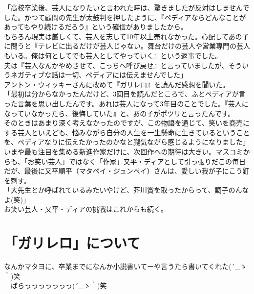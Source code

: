 「高校卒業後、芸人になりたいと言われた時は、驚きましたが反対はしませんでした。かつて顧問の先生が太鼓判を押したように、『ペディアならどんなことがあってもやり続けるだろう』という確信がありましたから。\\

もちろん現実は厳しくて、芸人を志して10年以上売れなかった。心配してあの子に問うと『テレビに出るだけが芸人じゃない。舞台だけの芸人や営業専門の芸人もいる。俺は何としてでも芸人としてやっていく』という返事でした。\\

夫は『芸人なんかやめさせて、こっちへ呼び戻せ』と言っていましたが、そういうネガティブな話は一切、ペディアには伝えませんでした」\\

アントン・ウィッキーさんに改めて『ガリレロ』を読んだ感想を聞いた。\\

「最初は分からなかったんだけど、3回目を読んだところで、ふとペディアが言った言葉を思い出したんです。あれは芸人になって3年目のことでした。『芸人になっていなかったら、後悔していた』と、あの子がポツリと言ったんです。\\

そのときはあまり深く考えなかったのですが、この物語を通じて、笑いを商売にする芸人といえども、悩みながら自分の人生を一生懸命に生きているということを、ペディアなりに伝えたかったのかなと朧気ながら感じるようになりました」\\

いまや最も注目を集める新進作家だけに、次回作への期待は大きい。マスコミからも、「お笑い芸人」ではなく「作家」又平・ディアとして引っ張りだこの毎日だが、最後に又平順平（マタペイ・ジュンペイ）さんは、愛しい我が子にこう釘を刺す。\\

「大先生とか呼ばれているみたいやけど、芥川賞を取ったからって、調子のんなよ(笑)」\\

お笑い芸人・又平・ディアの挑戦はこれからも続く。\\

\section{「ガリレロ」について}
なんかマタヨに、卒業までになんか小説書いてーや言うたら書いてくれた\sf(´\_ゝ｀)笑\\
　ばらっっっっっっっ\sf(´\_ゝ｀)笑

